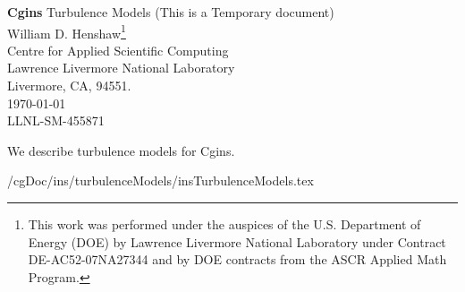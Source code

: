 \documentclass[11pt]{article}
\newcommand{\cgDoc}{\homeHenshaw/cgDoc}
\begin{document}


\def\comma  {~~~,~~}
\newcommand{\uvd}{\mathbf{U}}
\def\ud     {{    U}}
\def\pd     {{    P}}
\def\calo{{\cal O}}

\newcommand{\mbar}{\bar{m}}
\newcommand{\Rbar}{\bar{R}}
\newcommand{\Ru}{R_u}         %
\newcommand{\Div}{\grad\cdot}
\newcommand{\tauv}{\boldsymbol{\tau}}
\newcommand{\thetav}{\boldsymbol{\theta}}

\newcommand{\Omegav}{\boldsymbol{\Omega}}
\newcommand{\omegav}{\boldsymbol{\omega}}
\newcommand{\sigmav}{\boldsymbol{\sigma}}
\newcommand{\cm}{{\rm cm}}
\newcommand{\Jc}{{\mathcal J}}

\newcommand{\sumi}{\sum_{i=1}^n}
\newcommand{\dt}{{\Delta t}}

\def\ff {\tt} %



\newcommand{\bogus}[1]{}  %

\vspace{5\baselineskip}
\begin{flushleft}
{\Large
{\bf Cgins} Turbulence Models (This is a Temporary document) \\
}
\vspace{2\baselineskip}
William D. Henshaw\footnote{This work was performed under the auspices of the U.S. Department of Energy (DOE) by
Lawrence Livermore National Laboratory under Contract DE-AC52-07NA27344 and by 
DOE contracts from the ASCR Applied Math Program.}  \\
Centre for Applied Scientific Computing  \\
Lawrence Livermore National Laboratory      \\
Livermore, CA, 94551.  \\
\vspace{\baselineskip}
\today\\
\vspace{\baselineskip}
LLNL-SM-455871

\vspace{4\baselineskip}


We describe turbulence models for Cgins.

\end{flushleft}

\clearpage
\tableofcontents

\vfill\eject


\clearpage
 \cgDoc/ins/turbulenceModels/insTurbulenceModels.tex


\vfill\eject




\printindex
\end{document}
